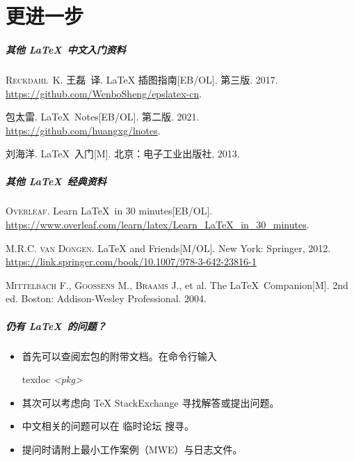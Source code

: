 
\part{更进一步}

\begin{frame}
  \frametitle{其他 \LaTeX\ 中文入门资料}
  \begin{bibliolist}{00}
    \onlineitem \textsc{Reckdahl~K.}
    王磊~译.
    \newblock \LaTeX{} 插图指南[EB/OL].
    \newblock 第三版. 2017. \url{https://github.com/WenboSheng/epslatex-cn}.

    \onlineitem 包太雷.
    \newblock \LaTeX\ Notes[EB/OL].
    \newblock 第二版. 2021. \url{https://github.com/huangxg/lnotes}.

    \bookitem 刘海洋.
    \newblock \LaTeX\ 入门[M]. 
    \newblock 北京：电子工业出版社, 2013.
  \end{bibliolist}
\end{frame}

\begin{frame}
  \frametitle{其他 \LaTeX\ 经典资料}
  \begin{bibliolist}{00}
    \onlineitem \textsc{Overleaf}.
    \newblock Learn \LaTeX\ in 30 minutes[EB/OL]. 
    \newblock \url{https://www.overleaf.com/learn/latex/Learn_LaTeX_in_30_minutes}.

    \bookitem \textsc{M.R.C. van Dongen}.
    \newblock \LaTeX{} and Friends[M/OL].
    \newblock New York: Springer, 2012. 
    \url{https://link.springer.com/book/10.1007/978-3-642-23816-1}

    \bookitem \textsc{Mittelbach F.}, \textsc{Goossens M.}, \textsc{Braams J.}, et al.
    \newblock The \LaTeX\ Companion[M].
    \newblock 2nd ed. Boston: Addison-Wesley Professional. 2004.
  \end{bibliolist}
\end{frame}

\begin{frame}
  \frametitle{仍有 \LaTeX\ 的问题？}
  \begin{itemize}
    \item 首先可以查阅宏包的附带文档。在命令行输入
    
    \hfill
    \begin{minipage}{0.3\textwidth}
      \begin{exampleblock}{\faTerminal}
        \ttfamily
        texdoc \textit{<pkg>}
      \end{exampleblock}
    \end{minipage}
    \item 其次可以考虑向 \TeX{} StackExchange  寻找解答或提出问题。
    \item 中文相关的问题可以在 \CTeX{} 临时论坛  搜寻。
    \item 提问时请附上最小工作案例（MWE）与日志文件。
  \end{itemize}
\end{frame}

